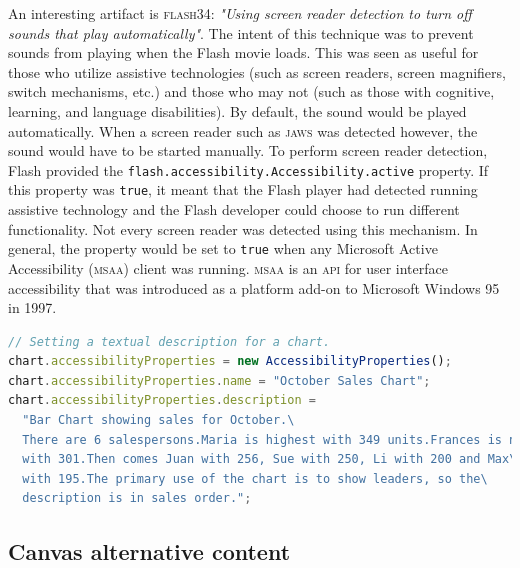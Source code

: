 \documentclass[sigconf]{acmart}
\begin{document}
An interesting artifact is \textsc{flash}34: \textit{"Using screen reader detection to turn off sounds that play automatically"}. The intent of this technique was to prevent sounds from playing when the Flash movie loads. This was seen as useful for those who utilize assistive technologies (such as screen readers, screen magnifiers, switch mechanisms, etc.) and those who may not (such as those with cognitive, learning, and language disabilities). By default, the sound would be played automatically. When a screen reader such as \textsc{jaws} was detected however, the sound would have to be started manually. To perform screen reader detection, Flash provided the \texttt{flash.accessibility.Accessibility.active} property. If this property was \texttt{true}, it meant that the Flash player had detected running assistive technology and the Flash developer could choose to run different functionality. Not every screen reader was detected using this mechanism. In general, the property would be set to \texttt{true} when any Microsoft Active Accessibility (\textsc{msaa}) client was running. \textsc{msaa} is an \textsc{api} for user interface accessibility that was introduced as a platform add-on to Microsoft Windows 95 in 1997. 

\begin{lstlisting}[language=JavaScript, style=ES6, label={lst:flash}, caption={Setting the description property for a non-text object in Flash (\textsc{flash}2)}]
// Setting a textual description for a chart.
chart.accessibilityProperties = new AccessibilityProperties();
chart.accessibilityProperties.name = "October Sales Chart";
chart.accessibilityProperties.description =
  "Bar Chart showing sales for October.\
  There are 6 salespersons.Maria is highest with 349 units.Frances is next\
  with 301.Then comes Juan with 256, Sue with 250, Li with 200 and Max\
  with 195.The primary use of the chart is to show leaders, so the\
  description is in sales order.";
\end{lstlisting}

\subsection{Canvas alternative content}
\end{document}
